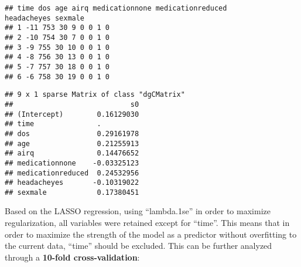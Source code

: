 \documentclass[]{article}
\newenvironment{Shaded}{\begin{snugshade}}{\end{snugshade}}
\newcommand{\DataTypeTok}[1]{\textcolor[rgb]{0.13,0.29,0.53}{#1}}
\newcommand{\DecValTok}[1]{\textcolor[rgb]{0.00,0.00,0.81}{#1}}
\newcommand{\FloatTok}[1]{\textcolor[rgb]{0.00,0.00,0.81}{#1}}
\newcommand{\KeywordTok}[1]{\textcolor[rgb]{0.13,0.29,0.53}{\textbf{#1}}}
\newcommand{\NormalTok}[1]{#1}
\newcommand{\OperatorTok}[1]{\textcolor[rgb]{0.81,0.36,0.00}{\textbf{#1}}}
\newcommand{\StringTok}[1]{\textcolor[rgb]{0.31,0.60,0.02}{#1}}
\begin{document}
\begin{Shaded}
\end{Shaded}

\begin{verbatim}
## time dos age airq medicationnone medicationreduced
headacheyes sexmale
## 1 -11 753 30 9 0 0 1 0
## 2 -10 754 30 7 0 0 1 0
## 3 -9 755 30 10 0 0 1 0
## 4 -8 756 30 13 0 0 1 0
## 5 -7 757 30 18 0 0 1 0
## 6 -6 758 30 19 0 0 1 0
\end{verbatim}

\begin{Shaded}
\end{Shaded}

\begin{verbatim}
## 9 x 1 sparse Matrix of class "dgCMatrix"
##                            s0
## (Intercept)        0.16129030
## time               .         
## dos                0.29161978
## age                0.21255913
## airq               0.14476652
## medicationnone    -0.03325123
## medicationreduced  0.24532956
## headacheyes       -0.10319022
## sexmale            0.17380451
\end{verbatim}

Based on the LASSO regression, using ``lambda.1se'' in order to maximize
regularization, all variables were retained except for ``time''. This
means that in order to maximize the strength of the model as a predictor
without overfitting to the current data, ``time'' should be excluded.
This can be further analyzed through a \textbf{10-fold
cross-validation}:
\end{document}
